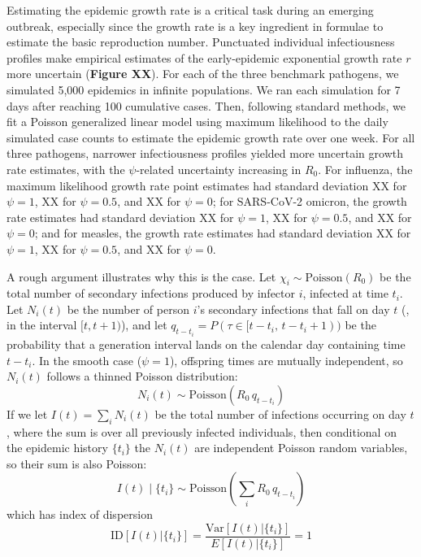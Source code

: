 Estimating the epidemic growth rate is a critical task during an emerging outbreak, especially since the growth rate is a key ingredient in formulae to estimate the basic reproduction number. Punctuated individual infectiousness profiles make empirical estimates of the early-epidemic exponential growth rate $r$ more uncertain ({\bf Figure XX}). For each of the three benchmark pathogens, we simulated 5,000 epidemics in infinite populations. We ran each simulation for 7 days after reaching 100 cumulative cases. Then, following standard methods, we fit a Poisson generalized linear model using maximum likelihood to the daily simulated case counts to estimate the epidemic growth rate over one week. For all three pathogens, narrower infectiousness profiles yielded more uncertain growth rate estimates, with the $\psi$-related uncertainty increasing in $R_0$. For influenza, the maximum likelihood growth rate point estimates had standard deviation XX for $\psi = 1$, XX for $\psi = 0.5$, and XX for $\psi = 0$; for SARS-CoV-2 omicron, the growth rate estimates had standard deviation XX for $\psi = 1$, XX for $\psi = 0.5$, and XX for $\psi = 0$; and for measles, the growth rate estimates had standard deviation XX for $\psi = 1$, XX for $\psi = 0.5$, and XX for $\psi = 0$.

A rough argument illustrates why this is the case. Let $\chi_i \sim \text{Poisson}(R_0)$ be the total number of secondary infections produced by infector $i$, infected at time $t_i$. Let $N_i(t)$ be the number of person $i$'s secondary infections that fall on day $t$ (\ie, in the interval $[t, t+1)$), and let $q_{t-t_i} = P(\tau \in [t-t_i,\, t-t_i+1))$ be the probability that a generation interval lands on the calendar day containing time $t - t_i$. In the smooth case ($\psi = 1$), offspring times are mutually independent, so $N_i(t)$ follows a thinned Poisson distribution:
\begin{equation}
	N_i(t) \sim \text{Poisson}(R_0 \, q_{t-t_i})
\end{equation}
If we let $I(t) = \sum_i N_i(t)$ be the total number of infections occurring on day $t$, where the sum is over all previously infected individuals, then conditional on the epidemic history $\{t_i\}$ the $N_i(t)$ are independent Poisson random variables, so their sum is also Poisson:
\begin{equation}
I(t) \mid \{t_i\} \sim \text{Poisson}\!\left(\sum_i R_0 \, q_{t-t_i}\right)
\end{equation}
which has index of dispersion
\begin{equation}
\text{ID}[I(t) |\{t_i\}] = \frac{\text{Var}[I(t) | \{t_i\}]}{E[I(t) | \{t_i\}]} = 1
\end{equation}

